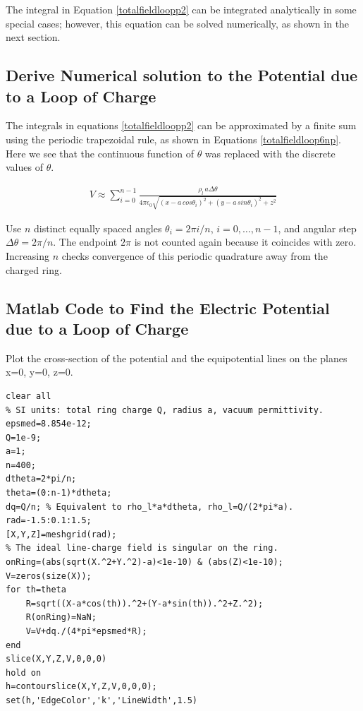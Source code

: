 \documentclass{ximera}
\begin{document}
The integral in Equation \ref{totalfieldloopp2} can be integrated analytically in some special cases; however, this equation can be solved numerically, as shown in the next section.






\subsection{Derive Numerical solution to the Potential due to a Loop of Charge}



The integrals in equations \ref{totalfieldloopp2} can be approximated by a finite sum using the periodic trapezoidal rule, as shown in Equations \ref{totalfieldloop6np}.  Here we see that the continuous function of $\theta$ was replaced with the discrete values of  $\theta$.




\begin{eqnarray}
V\approx \sum_{i=0}^{n-1}\frac{\rho_l \, a   \Delta \theta }{4 \pi \epsilon_{0} {  \sqrt{(x - a \,cos{\theta_i})^2 +(y - a \,sin{\theta_i})^2 +z ^2}  }}  \label{totalfieldloop6np}
\end{eqnarray}

Use $n$ distinct equally spaced angles $\theta_i=2\pi i/n$, $i=0,\ldots,n-1$, and angular step $\Delta\theta=2\pi/n$. The endpoint $2\pi$ is not counted again because it coincides with zero. Increasing $n$ checks convergence of this periodic quadrature away from the charged ring.


\subsection{Matlab Code to Find the Electric Potential due to a Loop of Charge }
 

 Plot the cross-section of the potential and the equipotential lines on the planes x=0, y=0, z=0. 
  \begin{verbatim}
clear all
% SI units: total ring charge Q, radius a, vacuum permittivity.
epsmed=8.854e-12;
Q=1e-9;
a=1;
n=400;
dtheta=2*pi/n;
theta=(0:n-1)*dtheta;
dq=Q/n; % Equivalent to rho_l*a*dtheta, rho_l=Q/(2*pi*a).
rad=-1.5:0.1:1.5;
[X,Y,Z]=meshgrid(rad);
% The ideal line-charge field is singular on the ring.
onRing=(abs(sqrt(X.^2+Y.^2)-a)<1e-10) & (abs(Z)<1e-10);
V=zeros(size(X));
for th=theta
    R=sqrt((X-a*cos(th)).^2+(Y-a*sin(th)).^2+Z.^2);
    R(onRing)=NaN;
    V=V+dq./(4*pi*epsmed*R);
end
slice(X,Y,Z,V,0,0,0)
hold on
h=contourslice(X,Y,Z,V,0,0,0);
set(h,'EdgeColor','k','LineWidth',1.5)
\end{verbatim}
\end{document}
